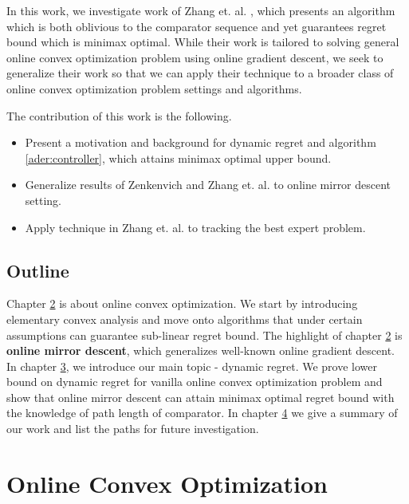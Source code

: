 \documentclass[12pt, a4paper]{report}
\begin{document}
In this work, we investigate work of Zhang et. al. \cite{Zhang2018AdaptiveOL}, which presents an algorithm which is both oblivious to the comparator sequence and yet guarantees regret bound which is minimax optimal. While their work is tailored to solving general online convex optimization problem using online gradient descent, we seek to generalize their work so that we can apply their technique to a broader class of online convex optimization problem settings and algorithms.

The contribution of this work is the following.
\begin{itemize}
    \item Present a motivation and background for dynamic regret and algorithm \ref{ader:controller}, which attains minimax optimal upper bound. 
    \item Generalize results of Zenkenvich \cite{Zinkevich2003OnlineCP} and Zhang et. al. \cite{Zhang2018AdaptiveOL} to online mirror descent setting.
    \item Apply technique in Zhang et. al. \cite{Zhang2018AdaptiveOL} to tracking the best expert problem.
\end{itemize}



\section{Outline}
Chapter \hyperref[Chap2]{2} is about online convex optimization. We start by introducing elementary convex analysis and move onto algorithms that under certain assumptions can guarantee sub-linear regret bound. The highlight of chapter \hyperref[Chap2]{2} is \textbf{online mirror descent}, which generalizes well-known online gradient descent. In chapter \hyperref[Chap3]{3}, we introduce our main topic - dynamic regret. We prove lower bound on dynamic regret for vanilla online convex optimization problem and show that online mirror descent can attain minimax optimal regret bound with the knowledge of path length of comparator.  
In chapter \hyperref[Chap4]{4} we give a summary of our work and list the paths for future investigation.

\chapter{Online Convex Optimization}
\label{Chap2}
\end{document}
